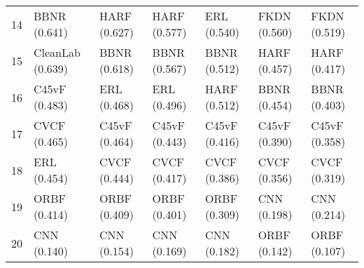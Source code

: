 \begin{tabular}{lllllll}
14   &      BBNR (0.641) &      HARF (0.627) &      HARF (0.577) &       ERL (0.540) &      FKDN (0.560) &      FKDN (0.519) \\
15   &  CleanLab (0.639) &      BBNR (0.618) &      BBNR (0.567) &      BBNR (0.512) &      HARF (0.457) &      HARF (0.417) \\
16   &     C45vF (0.483) &       ERL (0.468) &       ERL (0.496) &      HARF (0.512) &      BBNR (0.454) &      BBNR (0.403) \\
17   &      CVCF (0.465) &     C45vF (0.464) &     C45vF (0.443) &     C45vF (0.416) &     C45vF (0.390) &     C45vF (0.358) \\
18   &       ERL (0.454) &      CVCF (0.444) &      CVCF (0.417) &      CVCF (0.386) &      CVCF (0.356) &      CVCF (0.319) \\
19   &      ORBF (0.414) &      ORBF (0.409) &      ORBF (0.401) &      ORBF (0.309) &       CNN (0.198) &       CNN (0.214) \\
20   &       CNN (0.140) &       CNN (0.154) &       CNN (0.169) &       CNN (0.182) &      ORBF (0.142) &      ORBF (0.107) \\
\bottomrule
\end{tabular}
